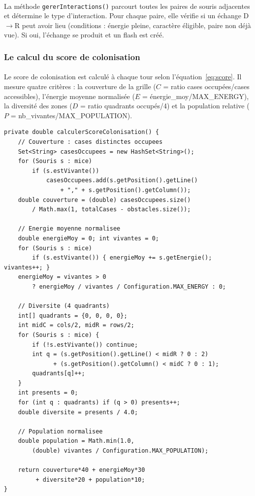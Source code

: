 \paragraph{} La méthode \texttt{gererInteractions()} parcourt toutes les paires de souris adjacentes et détermine le type d'interaction. Pour chaque paire, elle vérifie si un échange D$\rightarrow$R peut avoir lieu (conditions : énergie pleine, caractère éligible, paire non déjà vue). Si oui, l'échange se produit et un flash est créé.

\subsubsection{Le calcul du score de colonisation}

\paragraph{} Le score de colonisation est calculé à chaque tour selon l'équation~\ref{eq:score}. Il mesure quatre critères : la couverture de la grille ($C$ = ratio cases occupées/cases accessibles), l'énergie moyenne normalisée ($E$ = énergie\_moy/MAX\_ENERGY), la diversité des zones ($D$ = ratio quadrants occupés/4) et la population relative ($P$ = nb\_vivantes/MAX\_POPULATION).

\begin{lstlisting}[caption={Calcul du score de colonisation}]
private double calculerScoreColonisation() {
    // Couverture : cases distinctes occupees
    Set<String> casesOccupees = new HashSet<String>();
    for (Souris s : mice)
        if (s.estVivante())
            casesOccupees.add(s.getPosition().getLine()
                + "," + s.getPosition().getColumn());
    double couverture = (double) casesOccupees.size()
        / Math.max(1, totalCases - obstacles.size());

    // Energie moyenne normalisee
    double energieMoy = 0; int vivantes = 0;
    for (Souris s : mice)
        if (s.estVivante()) { energieMoy += s.getEnergie(); vivantes++; }
    energieMoy = vivantes > 0
        ? energieMoy / vivantes / Configuration.MAX_ENERGY : 0;

    // Diversite (4 quadrants)
    int[] quadrants = {0, 0, 0, 0};
    int midC = cols/2, midR = rows/2;
    for (Souris s : mice) {
        if (!s.estVivante()) continue;
        int q = (s.getPosition().getLine() < midR ? 0 : 2)
              + (s.getPosition().getColumn() < midC ? 0 : 1);
        quadrants[q]++;
    }
    int presents = 0;
    for (int q : quadrants) if (q > 0) presents++;
    double diversite = presents / 4.0;

    // Population normalisee
    double population = Math.min(1.0,
        (double) vivantes / Configuration.MAX_POPULATION);

    return couverture*40 + energieMoy*30
         + diversite*20 + population*10;
}
\end{lstlisting}

